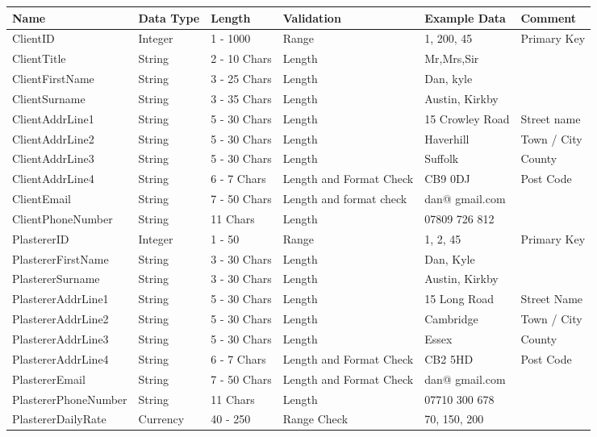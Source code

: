 \begin{flushleft}
\begin{longtable}{|p{4cm}|p{2cm}|p{2cm}|p{2cm}|p{2cm}|p{2cm}|}
\hline
\textbf{Name} & \textbf{Data Type} & \textbf{Length} & \textbf{Validation} & \textbf{Example Data} & \textbf{Comment} \\ \hline



ClientID & Integer & 1 - 1000 & Range & 1, 200, 45 & Primary Key \\ \hline
ClientTitle & String & 2 - 10 Chars & Length & Mr,Mrs,Sir &  \\ \hline 
ClientFirstName & String & 3 - 25 Chars & Length & Dan, kyle &  \\ \hline 
ClientSurname & String & 3 - 35 Chars & Length & Austin, Kirkby &  \\ \hline 
ClientAddrLine1 & String & 5 - 30 Chars & Length & 15 Crowley Road &  Street name \\ \hline 
ClientAddrLine2 & String & 5 - 30 Chars & Length & Haverhill & Town / City \\ \hline 
ClientAddrLine3 & String & 5 - 30 Chars & Length & Suffolk & County  \\ \hline 
ClientAddrLine4 & String & 6 - 7 Chars & Length and Format Check & CB9 0DJ & Post Code\\ \hline 
ClientEmail & String & 7 - 50 Chars & Length and format check & dan@ gmail.com &  \\ \hline 
ClientPhoneNumber & String & 11 Chars & Length & 07809 726 812 &  \\ \hline \hline



PlastererID & Integer & 1 - 50  & Range  & 1, 2, 45 & Primary Key \\ \hline
PlastererFirstName & String & 3 - 30 Chars & Length & Dan, Kyle & \\ \hline
PlastererSurname & String & 3 - 30 Chars & Length & Austin, Kirkby & \\ \hline
PlastererAddrLine1 & String & 5 - 30 Chars & Length & 15 Long Road & Street Name \\ \hline
PlastererAddrLine2 & String & 5 - 30 Chars & Length & Cambridge & Town / City \\ \hline
PlastererAddrLine3 & String & 5 - 30 Chars & Length & Essex & County \\ \hline
PlastererAddrLine4 & String & 6 - 7 Chars & Length and Format Check & CB2 5HD & Post Code \\ \hline
PlastererEmail & String & 7 - 50 Chars & Length and Format Check & dan@ gmail.com  &  \\ \hline
PlastererPhoneNumber & String & 11 Chars & Length & 07710 300 678 & \\ \hline
PlastererDailyRate & Currency & 40 - 250 & Range Check & 70, 150, 200 & \\ \hline \hline




\end{longtable}
\end{flushleft}
